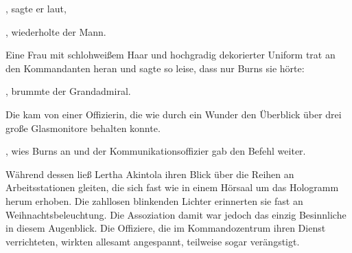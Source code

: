 \par

, sagte er laut, 

\par

, wiederholte der Mann. 

\par

Eine Frau mit schlohweißem Haar und hochgradig dekorierter Uniform trat an den Kommandanten heran und sagte so leise, dass nur Burns sie hörte: 

\par

, brummte der Grandadmiral. 

\par

 Die kam von einer Offizierin, die wie durch ein Wunder den Überblick über drei große Glasmonitore behalten konnte.

\par

, wies Burns an und der Kommunikationsoffizier gab den Befehl weiter.

\par

Während dessen ließ Lertha Akintola ihren Blick über die Reihen an Arbeitsstationen gleiten, die sich fast wie in einem Hörsaal um das Hologramm herum erhoben. Die zahllosen blinkenden Lichter erinnerten sie fast an Weihnachtsbeleuchtung. Die Assoziation damit war jedoch das einzig Besinnliche in diesem Augenblick. Die Offiziere, die im Kommandozentrum ihren Dienst verrichteten, wirkten allesamt angespannt, teilweise sogar verängstigt.

